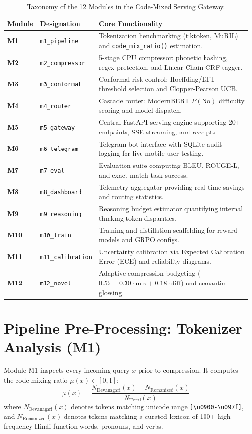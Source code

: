 \begin{table}[htbp]
\centering
\small
\caption{Taxonomy of the 12 Modules in the Code-Mixed Serving Gateway.}
\label{tab:gateway_modules}
\begin{tabularx}{\textwidth}{lp{4.2cm}X}
\toprule
\textbf{Module} & \textbf{Designation} & \textbf{Core Functionality} \\
\midrule
\textbf{M1} & \texttt{m1\_pipeline} & Tokenization benchmarking (tiktoken, MuRIL) and \texttt{code\_mix\_ratio()} estimation. \\
\textbf{M2} & \texttt{m2\_compressor} & 5-stage CPU compressor: phonetic hashing, regex protection, and Linear-Chain CRF tagger. \\
\textbf{M3} & \texttt{m3\_conformal} & Conformal risk control: Hoeffding/LTT threshold selection and Clopper-Pearson UCB. \\
\textbf{M4} & \texttt{m4\_router} & Cascade router: ModernBERT $P(\text{No})$ difficulty scoring and model dispatch. \\
\textbf{M5} & \texttt{m5\_gateway} & Central FastAPI serving engine supporting 20+ endpoints, SSE streaming, and receipts. \\
\textbf{M6} & \texttt{m6\_telegram} & Telegram bot interface with SQLite audit logging for live mobile user testing. \\
\textbf{M7} & \texttt{m7\_eval} & Evaluation suite computing BLEU, ROUGE-L, and exact-match task success. \\
\textbf{M8} & \texttt{m8\_dashboard} & Telemetry aggregator providing real-time savings and routing statistics. \\
\textbf{M9} & \texttt{m9\_reasoning} & Reasoning budget estimator quantifying internal thinking token disparities. \\
\textbf{M10} & \texttt{m10\_train} & Training and distillation scaffolding for reward models and GRPO configs. \\
\textbf{M11} & \texttt{m11\_calibration} & Uncertainty calibration via Expected Calibration Error (ECE) and reliability diagrams. \\
\textbf{M12} & \texttt{m12\_novel} & Adaptive compression budgeting ($0.52 + 0.30\cdot\text{mix} + 0.18\cdot\text{diff}$) and semantic glossing. \\
\bottomrule
\end{tabularx}
\end{table}

\section{Pipeline Pre-Processing: Tokenizer Analysis (M1)}
Module M1 inspects every incoming query $x$ prior to compression. It computes the code-mixing ratio $\mu(x) \in [0, 1]$:
\begin{equation}
    \mu(x) = \frac{N_{\text{Devanagari}}(x) + N_{\text{Romanized}}(x)}{N_{\text{Total}}(x)}
\end{equation}
where $N_{\text{Devanagari}}(x)$ denotes tokens matching unicode range \texttt{[\textbackslash u0900-\textbackslash u097f]}, and $N_{\text{Romanized}}(x)$ denotes tokens matching a curated lexicon of 100+ high-frequency Hindi function words, pronouns, and verbs.

